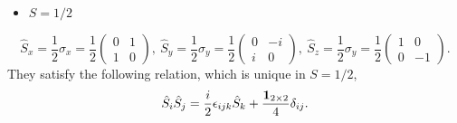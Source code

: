 \documentclass[11pt, aps, longbibliography]{article}
\begin{document}
        \begin{itemize}
            \item $S=1/2$
        \end{itemize}
        \begin{equation}
            \hat{S}_x = \frac{1}{2}\sigma_x = \frac{1}{2}\begin{pmatrix} 0 & 1 \\ 1 & 0 \end{pmatrix}, \ 
            \hat{S}_y = \frac{1}{2}\sigma_y = \frac{1}{2}\begin{pmatrix} 0 & -i \\ i & 0 \end{pmatrix}, \ 
            \hat{S}_z = \frac{1}{2}\sigma_y = \frac{1}{2}\begin{pmatrix} 1 & 0 \\ 0 & -1 \end{pmatrix}.
        \end{equation}
        They satisfy the following relation, which is unique in $S=1/2$,
        \begin{equation}\label{eq:pauli}
            \hat{S}_{i}\hat{S}_j = \frac{i}{2}\epsilon_{ijk}\hat{S}_k + \frac{\bold{1}_{2\times2}}{4}\delta_{ij}.
        \end{equation}
\end{document}
